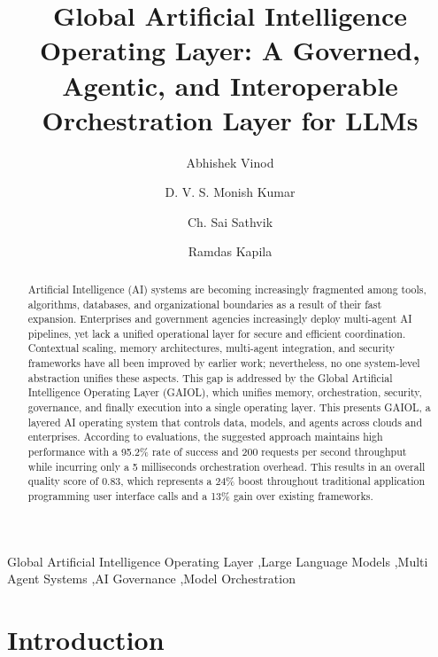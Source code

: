 \documentclass[final,5p,times,twocolumn,authoryear,draft]{elsarticle}
\begin{document}
\begin{frontmatter}

\title{Global Artificial Intelligence Operating Layer: A Governed, Agentic, and Interoperable Orchestration Layer for LLMs}

\author[inst1]{Abhishek Vinod}
\author[inst1]{D. V. S. Monish Kumar}
\author[inst1]{Ch. Sai Sathvik}
\author[inst1]{Ramdas Kapila}


\begin{abstract}

Artificial Intelligence (AI) systems are becoming increasingly fragmented among tools, algorithms, databases, and organizational boundaries as a result of their fast expansion. Enterprises and government agencies increasingly deploy multi-agent AI pipelines, yet lack a unified operational layer for secure and efficient coordination. Contextual scaling, memory architectures, multi-agent integration, and security frameworks have all been improved by earlier work; nevertheless, no one system-level abstraction unifies these aspects. This gap is addressed by the Global Artificial Intelligence Operating Layer (GAIOL), which unifies memory, orchestration, security, governance, and finally execution into a single operating layer. This presents GAIOL, a layered AI operating system that controls data, models, and agents across clouds and enterprises.
According to evaluations, the suggested approach maintains high performance with a 95.2\% rate of success and 200 requests per second throughput while incurring only a 5 milliseconds orchestration overhead. This results in an overall quality score of 0.83, which represents a 24\% boost throughout traditional application programming user interface calls and a 13\% gain over existing frameworks.

\end{abstract}

\begin{keyword}
Global Artificial Intelligence Operating Layer \sep Large Language Models \sep Multi Agent Systems \sep AI Governance \sep Model Orchestration
\end{keyword}

\end{frontmatter}

\section{Introduction}
\end{document}
